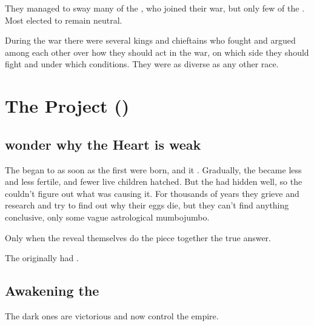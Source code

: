 They managed to sway many of the \aryothim{}, who joined their war, but only few of the \vorcanths{}. 
Most \vorcanths{} elected to remain neutral. 

During the war there were several \aryoth{} kings and chieftains who fought and argued among each other over how they should act in the war, on which side they should fight and under which conditions. 
They were as diverse as any other race. 















\section{The \Sathariah Project ()}









\subsection{\Dragons wonder why the Heart is weak}
The  began to  as soon as the first \resphain{} were born, and it . 
Gradually, the \dragons{} became less and less fertile, and fewer live children hatched. 
But the \banelords{} had hidden  well, so the \dragons{} couldn't figure out what was causing it. 
For thousands of years they grieve and research and try to find out why their eggs die, but they can't find anything conclusive, only some vague astrological  mumbojumbo. 

Only when the \resphain{} reveal themselves do the \dragons{} piece together the true answer.   

The \dragons originally had . 









\subsection{Awakening the \banelords}
The dark ones are victorious and now control the \resphan{} empire. 

